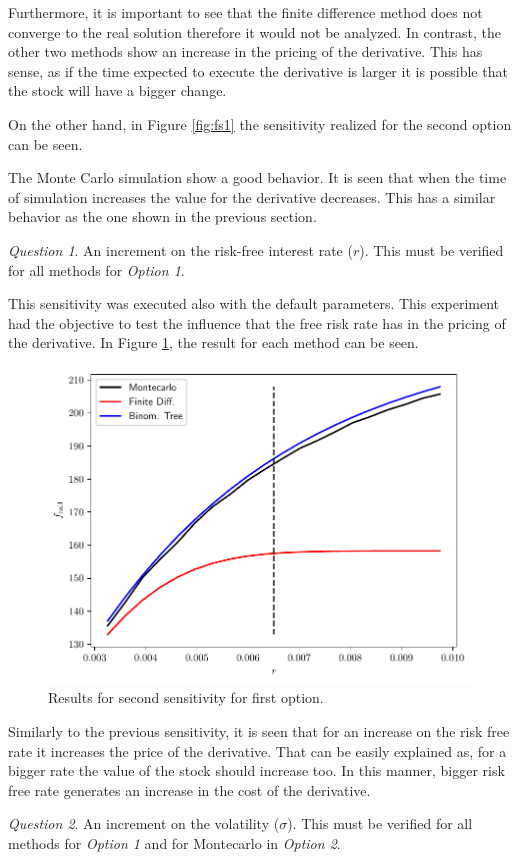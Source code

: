 \documentclass[11pt]{article}
\theoremstyle{definition}
\theoremstyle{remark}
\theoremstyle{remark}
\newtheorem{question}{Question}
\begin{document}
Furthermore, it is important to see that the finite difference method does not
converge to the real solution therefore it would not be analyzed. In contrast,
the other two methods show an increase in the pricing of the derivative. This
has sense, as if the time expected to execute the derivative is larger it is
possible that the stock will have a bigger change.

On the other hand, in Figure \ref{fig:fs1} the sensitivity realized for the
second option can be seen.

The Monte Carlo simulation show a good behavior. It is seen that when the time
of simulation increases the value for the derivative decreases. This has a
similar behavior as the one shown in the previous section.
\begin{question}
  An increment on the risk-free interest rate ($r$). This must be verified for
  all methods for \textit{Option 1}.
\end{question}

This sensitivity was executed also with the default parameters. This experiment
had the objective to test the influence that the free risk rate has in the
pricing of the derivative. In Figure \ref{fig:ss}, the result for each method
can be seen.

\begin{figure}[]
  \centering
  \includegraphics[scale=.5]{../plts/second_sens_opt1}
  \caption{Results for second sensitivity for first option.}
  \label{fig:ss}
\end{figure}

Similarly to the previous sensitivity, it is seen that for an increase on the
risk free rate it increases the price of the derivative. That can be easily
explained as, for a bigger rate the value of the stock should increase too. In
this manner, bigger risk free rate generates an increase in the cost of the derivative.
\begin{question}
  An increment on the volatility ($\sigma$). This must be verified for all
  methods for \textit{Option 1} and for Montecarlo in \textit{Option 2}.
\end{question}
\end{document}
